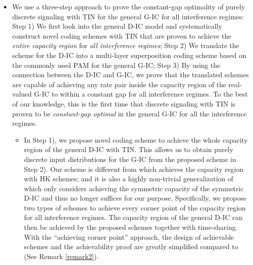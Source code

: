 \documentclass[12pt, draftclsnofoot, onecolumn]{IEEEtran}
\theoremstyle{definition}
\begin{document}
\begin{itemize}
\item We use a three-step approach to prove the constant-gap optimality of purely discrete signaling with TIN for the general G-IC for all interference regimes: Step 1) We first look into the general D-IC model \cite{doi:10.1002/ett.1287} and systematically construct novel coding schemes with TIN that are proven to achieve the \emph{entire capacity region} for \emph{all interference regimes}; Step 2) We translate the scheme for the D-IC into a multi-layer superposition coding scheme based on the commonly used PAM for the general G-IC; Step 3) By using the connection between the D-IC and G-IC, we prove that the translated schemes are capable of achieving any rate pair inside the capacity region of the real-valued G-IC to within a constant gap for all interference regimes. To the best of our knowledge, this is the first time that discrete signaling with TIN is proven to be \emph{constant-gap optimal} in the general G-IC for all the interference regimes.


\begin{itemize}
\item In Step 1), we propose novel coding scheme to achieve the whole capacity region of the general D-IC with TIN. This allows us to obtain purely discrete input distributions for the G-IC from the proposed scheme in Step 2). Our scheme is different from \cite{doi:10.1002/ett.1287} which achieves the capacity region with HK schemes; and it is also a highly non-trivial generalization of \cite{ShuoLithesis} which only considers achieving the symmetric capacity of the symmetric D-IC and thus no longer suffices for our purpose. Specifically, we propose two types of schemes to achieve every corner point of the capacity region for all interference regimes. The capacity region of the general D-IC can then be achieved by the proposed schemes together with time-sharing. With the ``achieving corner point'' approach, the design of achievable schemes and the achievability proof are greatly simplified compared to \cite{ShuoLithesis} (See Remark \ref{remark2}).







\end{itemize}
\end{itemize}
\end{document}
